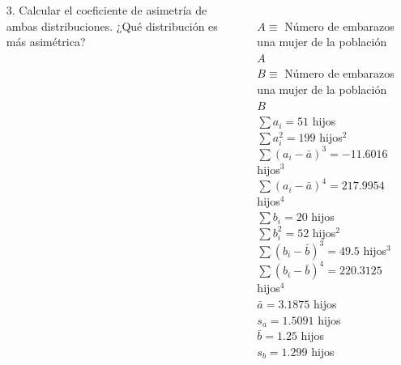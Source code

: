 \documentclass[aspectratio=149,10pt,t]{beamer}
\begin{document}
\begin{frame}
	\begin{columns}
		\begin{column}[T]{0.65\textwidth}
			\begin{enumerate}
			  \item[3.] Calcular el coeficiente de asimetría de ambas distribuciones.
			  ¿Qué distribución es más asimétrica?
			\end{enumerate}
		\end{column}
		\begin{column}[T]{0.35\textwidth}
			\\
			$A\equiv$ Número de embarazos una mujer de la población $A$\\
			$B\equiv$ Número de embarazos una mujer de la población $B$\\
			$\sum a_i=51$ hijos\\
			$\sum a_i^2=199$ hijos$^2$\\
			$\sum (a_i-\bar a)^3=-11.6016$ hijos$^3$\\
			$\sum (a_i-\bar a)^4=217.9954$ hijos$^4$\\
			$\sum b_i=20$ hijos\\
			$\sum b_i^2=52$ hijos$^2$\\
			$\sum (b_i-\bar b)^3=49.5$ hijos$^3$\\
			$\sum (b_i-\bar b)^4=220.3125$ hijos$^4$\\
			$\bar a=3.1875$ hijos\\
			$s_a = 1.5091$ hijos\\
			$\bar b=1.25$ hijos\\
			$s_b = 1.299$ hijos
			\end{column}
	\end{columns}
\end{frame}
\end{document}
